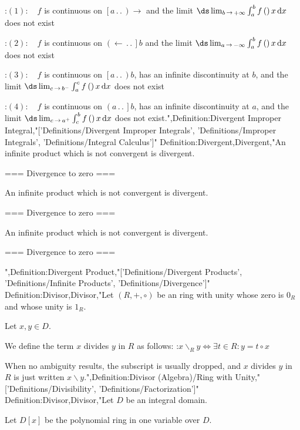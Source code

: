 :$(1): \quad f$ is continuous on $\left[ a \,.\,.\,   \right)\to$ and the limit $\ds \lim_{b \mathop \to +\infty} \int_a^b f \left(   \right)x \,\mathrm d x$ does not exist

:$(2): \quad f$ is continuous on $\left( \gets \,.\,.\,   \right]b$ and the limit $\ds \lim_{a \mathop \to -\infty} \int_a^b f \left(   \right)x \,\mathrm d x$ does not exist

:$(3): \quad f$ is continuous on $\left[ a \,.\,.\,   \right)b$, has an infinite discontinuity at $b$, and the limit $\ds \lim_{c \mathop \to b^-} \int_a^c f \left(   \right)x \,\mathrm d x$ does not exist

:$(4): \quad f$ is continuous on $\left( a \,.\,.\,   \right]b$, has an infinite discontinuity at $a$, and the limit $\ds \lim_{c \mathop \to a^+} \int_c^b f \left(   \right)x \,\mathrm d x$ does not exist.",Definition:Divergent Improper Integral,"['Definitions/Divergent Improper Integrals', 'Definitions/Improper Integrals', 'Definitions/Integral Calculus']"
Definition:Divergent,Divergent,"An infinite product which is not convergent is divergent.




=== Divergence to zero ===

An infinite product which is not convergent is divergent.




=== Divergence to zero ===

An infinite product which is not convergent is divergent.




=== Divergence to zero ===

",Definition:Divergent Product,"['Definitions/Divergent Products', 'Definitions/Infinite Products', 'Definitions/Divergence']"
Definition:Divisor,Divisor,"Let $\left( R, +, \circ \right)$ be an ring with unity whose zero is $0_R$ and whose unity is $1_R$.

Let $x, y \in D$.

We define the term $x$ divides $y$ in $R$ as follows:
:$x \mathrel {\mathrel \backslash_R} y \iff \exists t \in R: y = t \circ x$


When no ambiguity results, the subscript is usually dropped, and $x$ divides $y$ in $R$ is just written $x \mathrel \backslash y$.",Definition:Divisor (Algebra)/Ring with Unity,"['Definitions/Divisibility', 'Definitions/Factorization']"
Definition:Divisor,Divisor,"Let $D$ be an integral domain.

Let $D \left[ x \right]$ be the polynomial ring in one variable over $D$.

